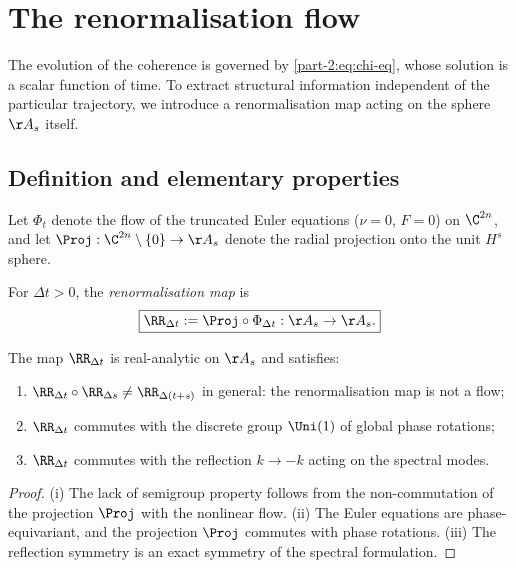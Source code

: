 \section{The renormalisation flow}
\label{part-2:sec:renorm}

The evolution of the coherence is governed by \eqref{part-2:eq:chi-eq}, whose 
solution is a scalar function of time. To extract structural 
information independent of the particular trajectory, we introduce a 
renormalisation map acting on the sphere $\AA_s$ itself.

\subsection{Definition and elementary properties}
\label{part-2:ssec:renorm-def}

Let $\Phi_t$ denote the flow of the truncated Euler equations 
($\nu=0$, $F=0$) on $\C^{2n}$, and let $\Proj:\C^{2n}\setminus\{0\}\to\AA_s$ 
denote the radial projection onto the unit $H^s$ sphere.

\begin{definition}\label{part-2:def:renorm}
For $\Delta t>0$, the \emph{renormalisation map} is
\begin{equation}\label{part-2:eq:renorm-def}
\boxed{
\RR_{\Delta t} := \Proj \circ \Phi_{\Delta t} : \AA_s \to \AA_s.
}
\end{equation}
\end{definition}

\begin{proposition}\label{part-2:prop:renorm-props}
The map $\RR_{\Delta t}$ is real-analytic on $\AA_s$ and satisfies:
\begin{enumerate}[label=(\roman*),leftmargin=*]
\item $\RR_{\Delta t}\circ\RR_{\Delta s} \neq \RR_{\Delta(t+s)}$ in 
      general: the renormalisation map is not a flow;
\item $\RR_{\Delta t}$ commutes with the discrete group 
      $\Uni(1)$ of global phase rotations;
\item $\RR_{\Delta t}$ commutes with the reflection 
      $k\to -k$ acting on the spectral modes.
\end{enumerate}
\end{proposition}

\begin{proof}
(i) The lack of semigroup property follows from the non-commutation of 
the projection $\Proj$ with the nonlinear flow. (ii) The Euler 
equations are phase-equivariant, and the projection $\Proj$ commutes 
with phase rotations. (iii) The reflection symmetry is an exact 
symmetry of the spectral formulation.
\end{proof}

